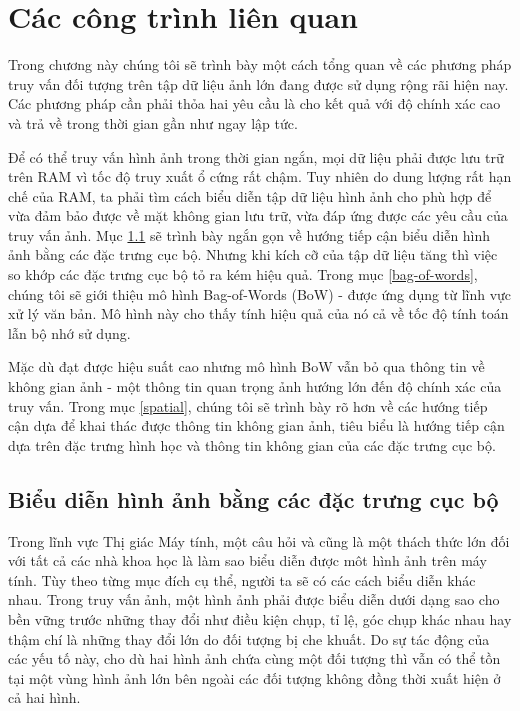 \chapter{Các công trình liên quan}
\label{chapter:related}
\ifpdf
    \graphicspath{{Chapter2/Chapter2Figs/PNG/}{Chapter2/Chapter2Figs/PDF/}{Chapter2/Chapter2Figs/}}
\else
    \graphicspath{{Chapter2/Chapter2Figs/EPS/}{Chapter2/Chapter2Figs/}}
\fi


Trong chương này chúng tôi sẽ trình bày một cách tổng quan về các phương pháp truy vấn đối tượng trên tập dữ liệu ảnh lớn đang được sử dụng rộng rãi hiện nay. Các phương pháp cần phải thỏa hai yêu cầu là cho kết quả với độ chính xác cao và trả về trong thời gian gần như ngay lập tức.

Để có thể truy vấn hình ảnh trong thời gian ngắn, mọi dữ liệu phải được lưu trữ trên RAM vì tốc độ truy xuất ổ cứng rất chậm. Tuy nhiên do dung lượng rất hạn chế của RAM, ta phải tìm cách biểu diễn tập dữ liệu hình ảnh cho phù hợp để vừa đảm bảo được về mặt không gian lưu trữ, vừa đáp ứng được các yêu cầu của truy vấn ảnh. Mục \ref{local-features} sẽ trình bày ngắn gọn về hướng tiếp cận biểu diễn hình ảnh bằng các đặc trưng cục bộ. Nhưng khi kích cỡ của tập dữ liệu tăng thì việc so khớp các đặc trưng cục bộ tỏ ra kém hiệu quả. Trong mục \ref{bag-of-words}, chúng tôi sẽ giới thiệu mô hình Bag-of-Words (BoW) -  được ứng dụng từ lĩnh vực xử lý văn bản. Mô hình này cho thấy tính hiệu quả của nó cả về tốc độ tính toán lẫn bộ nhớ sử dụng.

Mặc dù đạt được hiệu suất cao nhưng mô hình BoW vẫn bỏ qua thông tin về không gian ảnh - một thông tin quan trọng ảnh hướng lớn đến độ chính xác của truy vấn. Trong mục \ref{spatial}, chúng tôi sẽ trình bày rõ hơn về các hướng tiếp cận dựa để khai thác được thông tin không gian ảnh, tiêu biểu là hướng tiếp cận dựa trên đặc trưng hình học và thông tin không gian của các đặc trưng cục bộ.


\section{Biểu diễn hình ảnh bằng các đặc trưng cục bộ}
\label{local-features}

Trong lĩnh vực Thị giác Máy tính, một câu hỏi và cũng là một thách thức lớn đối với tất cả các nhà khoa học là làm sao biểu diễn được môt hình ảnh trên máy tính. Tùy theo từng mục đích cụ thể, người ta sẽ có các cách biểu diễn khác nhau. Trong truy vấn ảnh, một hình ảnh phải được biểu diễn dưới dạng sao cho bền vững trước những thay đổi như điều kiện chụp, tỉ lệ, góc chụp khác nhau hay thậm chí là những thay đổi lớn do đối tượng bị che khuất. Do sự tác động của các yếu tố này, cho dù hai hình ảnh chứa cùng một đối tượng thì vẫn có thể tồn tại một vùng hình ảnh lớn bên ngoài các đối tượng không đồng thời xuất hiện ở cả hai hình.

